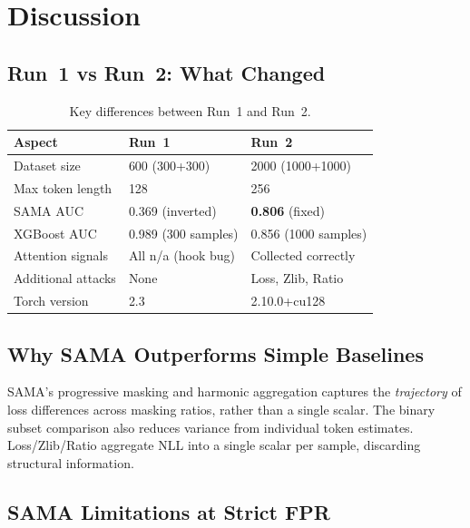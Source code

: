 \documentclass[11pt,a4paper]{article}
\begin{document}
\section{Discussion}

\subsection{Run~1 vs Run~2: What Changed}

\begin{table}[H]
\centering
\caption{Key differences between Run~1 and Run~2.}
\label{tab:run_diff}
\begin{tabular}{lll}
\toprule
Aspect & Run~1 & Run~2 \\
\midrule
Dataset size         & 600 (300+300)       & 2000 (1000+1000) \\
Max token length     & 128                 & 256 \\
SAMA AUC             & 0.369 (inverted)    & \textbf{0.806} (fixed) \\
XGBoost AUC          & 0.989 (300 samples) & 0.856 (1000 samples) \\
Attention signals    & All n/a (hook bug)  & Collected correctly \\
Additional attacks   & None                & Loss, Zlib, Ratio \\
Torch version        & 2.3                 & 2.10.0+cu128 \\
\bottomrule
\end{tabular}
\end{table}

\subsection{Why SAMA Outperforms Simple Baselines}

SAMA's progressive masking and harmonic aggregation captures the \emph{trajectory}
of loss differences across masking ratios, rather than a single scalar.
The binary subset comparison also reduces variance from individual token estimates.
Loss/Zlib/Ratio aggregate NLL into a single scalar per sample, discarding
structural information.

\subsection{SAMA Limitations at Strict FPR}
\end{document}
